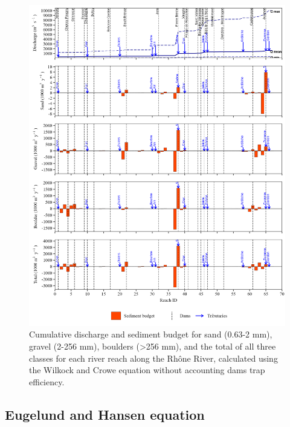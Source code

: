 \documentclass[
]{book}
\begin{document}
\begin{figure}
\includegraphics[width=26.24in]{img/res_cascade/res_E0_eW&C_noDams/plots_sed_budget-silt/sed_bud_res_sum_hy_E0_eW&C_noDams} \caption{Cumulative discharge and sediment budget for sand (0.63-2 mm), gravel (2-256 mm), boulders (>256 mm), and the total of all three classes for each river reach along the Rhône River, calculated using the Wilkock and Crowe equation without accounting dams trap efficiency.}\label{fig:budgetE0eW}
\end{figure}

\subsection{Eugelund and Hansen equation}\label{eugelund-and-hansen-equation}
\end{document}
